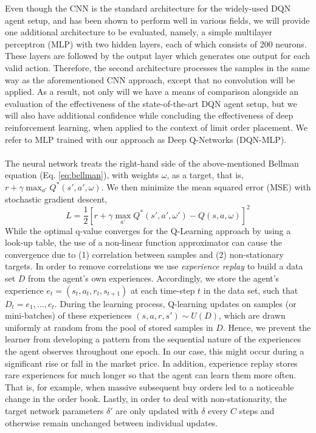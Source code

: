 Even though the CNN is the standard architecture for the widely-used DQN agent setup, and has been shown to perform well in various fields\cite{mnih2015human, mnih2013playing}, we will provide one additional architecture to be evaluated,
namely, a simple multilayer perceptron (MLP)\cite{haykin2009neural} with two hidden layers, each of which consists of 200 neurons. These layers are followed by the output layer which generates one output for each valid action.
Therefore, the second architecture processes the samples in the same way as the aforementioned CNN approach, except that no convolution will be applied.
As a result, not only will we have a means of comparison alongside an evaluation of the effectiveness of the state-of-the-art DQN agent setup, but we will also have additional confidence while concluding the effectiveness of deep reinforcement learning, when applied to the context of limit order placement. 
We refer to MLP trained with our approach as Deep Q-Networks (DQN-MLP).
\\
\\
The neural network treats the right-hand side of the above-mentioned Bellman equation (Eq. \ref{eq:bellman}), with weights $\omega$, as a target, that is, $r+\gamma \max_{a'} Q^*(s',a', \omega)$.
We then minimize the mean squared error (MSE) with stochastic gradient descent,
\begin{equation}
    L=\frac{1}{2}[r+\gamma \max_{a'} Q^*(s',a', \omega') - Q(s,a,\omega)]^2
\end{equation}
While the optimal q-value converges for the Q-Learning approach by using a look-up table, the use of a non-linear function approximator can cause the convergence due to (1) correlation between samples and (2) non-stationary targets.
In order to remove correlations we use \textit{experience replay} to build a data set $D$ from the agent's own experiences.
Accordingly, we store the agent's experience $e_t=(s_t, a_t, r_t, s_{t+1})$ at each time-step $t$ in the data set, such that $D_t = {e_1, ..., e_t}$.
During the learning process, Q-learning updates on samples (or mini-batches) of these experiences $(s,a,r,s') \sim U(D)$, which are drawn uniformly at random from the pool of stored samples in $D$.
Hence, we prevent the learner from developing a pattern from the sequential nature of the experiences the agent observes throughout one epoch.
In our case, this might occur during a significant rise or fall in the market price.
In addition, experience replay stores rare experiences for much longer so that the agent can learn them more often.
That is, for example, when massive subsequent buy orders led to a noticeable change in the order book.
Lastly, in order to deal with non-stationarity, the target network parameters $\delta'$ are only updated with $\delta$ every $C$ steps and otherwise remain unchanged between individual updates.
